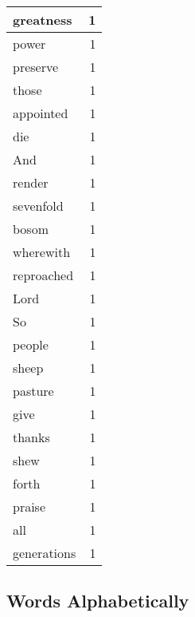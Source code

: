 \begin{center}
\begin{longtable}{l|r}
greatness & 1 \\ \hline
power & 1 \\ \hline
preserve & 1 \\ \hline
those & 1 \\ \hline
appointed & 1 \\ \hline
die & 1 \\ \hline
And & 1 \\ \hline
render & 1 \\ \hline
sevenfold & 1 \\ \hline
bosom & 1 \\ \hline
wherewith & 1 \\ \hline
reproached & 1 \\ \hline
Lord & 1 \\ \hline
So & 1 \\ \hline
people & 1 \\ \hline
sheep & 1 \\ \hline
pasture & 1 \\ \hline
give & 1 \\ \hline
thanks & 1 \\ \hline
shew & 1 \\ \hline
forth & 1 \\ \hline
praise & 1 \\ \hline
all & 1 \\ \hline
generations & 1 \\ \hline
\end{longtable}
\end{center}



\normalsize



\subsection{Words Alphabetically}

